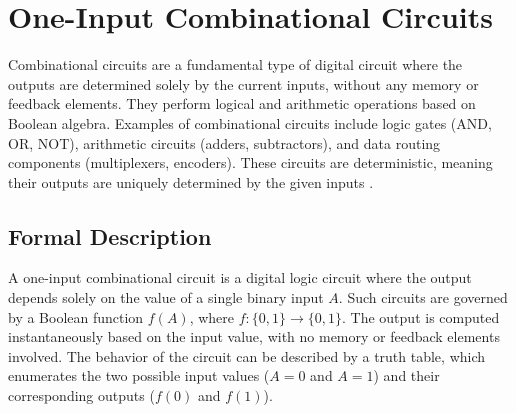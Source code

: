 
\section{One-Input Combinational Circuits}
Combinational circuits are a fundamental type of digital circuit where the outputs are determined solely by the current inputs, without any memory or feedback elements. They perform logical and arithmetic operations based on Boolean algebra. Examples of combinational circuits include logic gates (AND, OR, NOT), arithmetic circuits (adders, subtractors), and data routing components (multiplexers, encoders). These circuits are deterministic, meaning their outputs are uniquely determined by the given inputs \cite{mano2017}.

\subsection{Formal Description}
A one-input combinational circuit is a digital logic circuit where the output depends solely on the value of a single binary input \( A \). Such circuits are governed by a Boolean function \( f(A) \), where \( f: \{0, 1\} \to \{0, 1\} \). The output is computed instantaneously based on the input value, with no memory or feedback elements involved. The behavior of the circuit can be described by a truth table, which enumerates the two possible input values (\( A = 0 \) and \( A = 1 \)) and their corresponding outputs (\( f(0) \) and \( f(1) \)). 

